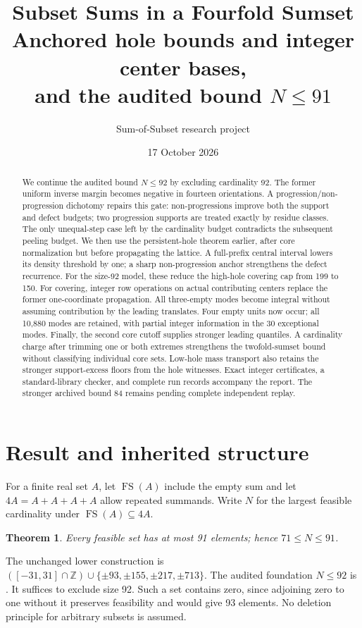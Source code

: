 \documentclass[11pt,a4paper]{article}
\title{Subset Sums in a Fourfold Sumset\\\large Anchored hole bounds and integer center bases,\\and the audited bound $N\le91$}
\author{Sum-of-Subset research project}
\date{17 October 2026}
\newcommand{\FS}{\operatorname{FS}}
\newcommand{\Z}{\mathbb Z}
\newtheorem{theorem}{Theorem}[section]
\begin{document}
\maketitle
\begin{abstract}
We continue the audited bound $N\le92$ by excluding cardinality 92.
The former uniform inverse margin becomes negative in fourteen
orientations. A progression/non-progression dichotomy repairs this
gate: non-progressions improve both the support and defect budgets;
two progression supports are treated exactly by residue classes.
The only unequal-step case left by the cardinality budget contradicts
the subsequent peeling budget. We then use the persistent-hole theorem
earlier, after core normalization but before propagating the lattice.
A full-prefix central interval lowers its density threshold by one;
a sharp non-progression anchor strengthens the defect recurrence.
For the size-92 model, these reduce the high-hole covering cap
from 199 to 150.
For covering, integer row operations on actual contributing centers
replace the former one-coordinate propagation. All three-empty modes
become integral without assuming contribution by the leading translates.
Four empty units now occur; all 10,880 modes are retained, with partial
integer information in the 30 exceptional modes. Finally, the second
core cutoff supplies stronger leading quantiles. A cardinality charge
after trimming one or both extremes strengthens the twofold-sumset
bound without classifying individual core sets. Low-hole mass transport
also retains the stronger support-excess floors from the hole witnesses.
Exact integer
certificates, a standard-library checker, and complete run records
accompany the report. The stronger archived bound 84 remains pending
complete independent replay.
\end{abstract}

\section{Result and inherited structure}
For a finite real set $A$, let $\FS(A)$ include the empty sum and let
$4A=A+A+A+A$ allow repeated summands. Write $N$ for the largest feasible
cardinality under $\FS(A)\subseteq4A$.
\begin{theorem}\label{main}
Every feasible set has at most 91 elements; hence $71\le N\le91$.
\end{theorem}
The unchanged lower construction is
$([-31,31]\cap\Z)\cup\{\pm93,\pm155,\pm217,\pm713\}$.
The audited foundation $N\le92$ is \cite{previous}. It suffices to
exclude size 92. Such a set contains zero, since adjoining zero to
one without it preserves feasibility and would give 93 elements.
No deletion principle for arbitrary subsets is assumed.
\end{document}
